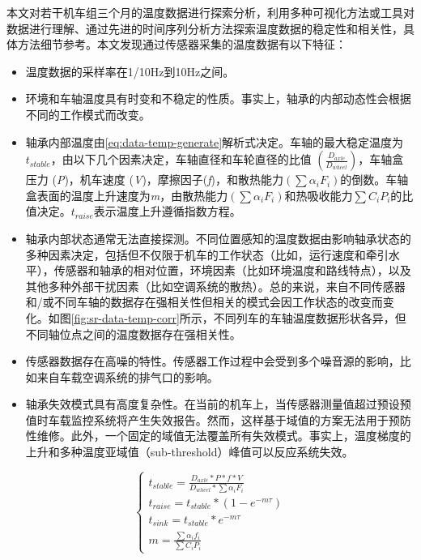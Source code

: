 本文对若干机车组三个月的温度数据进行探索分析，利用多种可视化方法或工具对数据进行理解、通过先进的时间序列分析方法探索温度数据的稳定性和相关性，具体方法细节参考。本文发现通过传感器采集的温度数据有以下特征：
\begin{itemize}
  \item 温度数据的采样率在1/10Hz到10Hz之间。
  \item 环境和车轴温度具有时变和不稳定的性质。事实上，轴承的内部动态性会根据不同的工作模式而改变。
  \item 轴承内部温度由\ref{eq:data-temp-generate}解析式决定\cite{陈德生2003列车轴温规律及红外线轴温探测方式的研究}。车轴的最大稳定温度为$t_{stable}$，由以下几个因素决定，车轴直径和车轮直径的比值 $(\frac{D_{axle}}{D_{wheel}})$，车轴盒压力 (\emph{P})，机车速度 (\emph{V})，摩擦因子(\emph{f})，和散热能力$(\sum {\alpha_{i}F_{i}})$的倒数。车轴盒表面的温度上升速度为\emph{m}，由散热能力$(\sum {\alpha_{i}F_{i}})$和热吸收能力$\sum {C_{i}P_{i}}$的比值决定。$t_{raise}$表示温度上升遵循指数方程。
  \item 轴承内部状态通常无法直接探测。不同位置感知的温度数据由影响轴承状态的多种因素决定，包括但不仅限于机车的工作状态（比如，运行速度和牵引水平），传感器和轴承的相对位置，环境因素（比如环境温度和路线特点），以及其他多种外部干扰因素（比如空调系统的散热）。总的来说，来自不同传感器和/或不同车轴的数据存在强相关性但相关的模式会因工作状态的改变而变化。如图\ref{fig:sr-data-temp-corr}所示，不同列车的车轴温度数据形状各异，但不同轴位点之间的温度数据存在强相关性。
  \item 传感器数据存在高噪的特性。传感器工作过程中会受到多个噪音源的影响，比如来自车载空调系统的排气口的影响。
  \item 轴承失效模式具有高度复杂性。在当前的机车上，当传感器测量值超过预设预值时车载监控系统将产生失效报告。然而，这样基于域值的方案无法用于预防性维修。此外，一个固定的域值无法覆盖所有失效模式。事实上，温度梯度的上升和多种温度亚域值（sub-threshold）峰值可以反应系统失效。
\end{itemize}
\begin{equation}
\label{eq:data-temp-generate}
\left\{\begin{array}{l}
t_{stable} = \frac{D_{axle}\ast P\ast f \ast V}{D_{wheel}\ast \sum \alpha_{i}F_{i}}  \\[0.2cm]
t_{raise} = t_{stable}\ast (1-e^{-m\tau}) \\[0.2cm]
t_{sink} = t_{stable} \ast e^{-m\tau} \\[0.2cm]
m = \frac{\sum \alpha_{i}f_{i}}{\sum C_{i}P_{i}}
\end{array}\right.
\end{equation}

